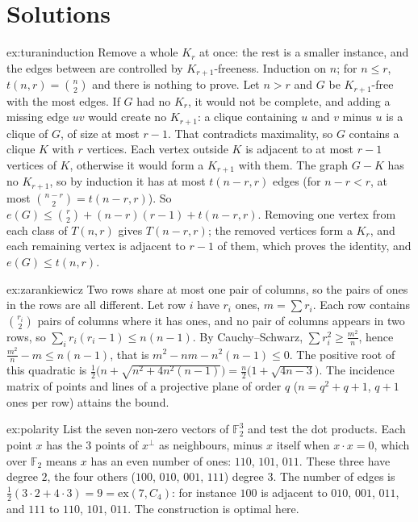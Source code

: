 \section{Solutions}

\begin{solution}{ex:turaninduction}
\idea Remove a whole $K_r$ at once: the rest is a smaller instance, and the edges between are controlled by $K_{r+1}$-freeness.
\writeup Induction on $n$; for $n\le r$, $t(n,r)=\binom n2$ and there is nothing to prove. Let $n>r$ and $G$ be $K_{r+1}$-free with the most edges. If $G$ had no $K_r$, it would not be
complete, and adding a missing edge $uv$ would create no $K_{r+1}$: a clique containing $u$ and $v$ minus $u$ is a clique of $G$, of size at most $r-1$. That contradicts maximality, so $G$
contains a clique $K$ with $r$ vertices. Each vertex outside $K$ is adjacent to at most
$r-1$ vertices of $K$, otherwise it would form a $K_{r+1}$ with them. The graph $G-K$ has no $K_{r+1}$, so by induction it has at most $t(n-r,r)$ edges (for $n-r<r$, at most
$\binom{n-r}2=t(n-r,r)$). So $e(G)\le\binom r2+(n-r)(r-1)+t(n-r,r)$. Removing one vertex from each class of $T(n,r)$ gives $T(n-r,r)$; the removed vertices form a $K_r$,
and each remaining vertex is adjacent to $r-1$ of them, which proves the identity, and $e(G)\le t(n,r)$.
\end{solution}

\begin{solution}{ex:zarankiewicz}
\idea Two rows share at most one pair of columns, so the pairs of ones in the rows are all different.
\writeup Let row $i$ have $r_i$ ones, $m=\sum r_i$. Each row contains $\binom{r_i}2$ pairs of columns where it has ones, and no pair of columns appears in two rows, so
$\sum_i r_i(r_i-1)\le n(n-1)$. By Cauchy--Schwarz, $\sum r_i^2\ge\frac{m^2}n$, hence $\frac{m^2}n-m\le n(n-1)$, that is $m^2-nm-n^2(n-1)\le0$. The positive root of this quadratic is
$\frac12\bigl(n+\sqrt{n^2+4n^2(n-1)}\bigr)=\frac n2\bigl(1+\sqrt{4n-3}\bigr)$. The incidence matrix of points and lines of a projective plane of order $q$ ($n=q^2+q+1$, $q+1$ ones per row) attains the bound.
\end{solution}

\begin{solution}{ex:polarity}
\idea List the seven non-zero vectors of $\mathbb F_2^3$ and test the dot products.
\writeup Each point $x$ has the $3$ points of $x^\perp$ as neighbours, minus $x$ itself when $x\cdot x=0$, which over $\mathbb F_2$ means $x$ has an even number of ones: $110$, $101$, $011$. These
three have degree $2$, the four others ($100$, $010$, $001$, $111$) degree $3$. The number of edges is $\frac12(3\cdot2+4\cdot3)=9=\mathrm{ex}(7,C_4)$: for instance $100$ is adjacent to $010$, $001$, $011$, and
$111$ to $110$, $101$, $011$. The construction is optimal here.
\end{solution}


